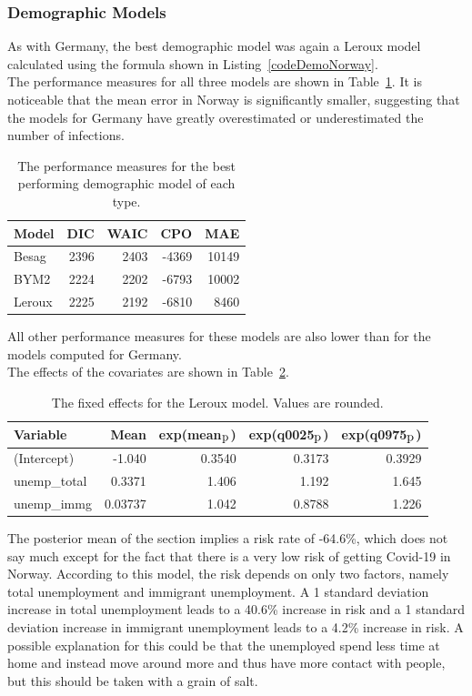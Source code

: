 \subsubsection{Demographic Models}
As with Germany, the best demographic model was again a Leroux model calculated using the formula shown in Listing~\ref{codeDemoNorway}. \\
The performance measures for all three models are shown in Table~\ref{demoNorway}. It is noticeable that the mean error in Norway is significantly smaller, suggesting that the models for Germany have greatly overestimated or underestimated the number of infections.
\begin{table}[H] 
\caption{The performance measures for the best performing demographic model of each type. \label{demoNorway}}
\begin{tabular}{l r r r r}
\toprule
\textbf{Model}	& \textbf{DIC}	& \textbf{WAIC} & \textbf{CPO} & \textbf{MAE}\\
\midrule
Besag  & 2396 & 2403 & -4369 & 10149 \\
BYM2 & 2224 & 2202 & -6793 & 10002\\
Leroux & 2225  & 2192 & -6810 & 8460\\
\bottomrule
\end{tabular}
\end{table}
All other performance measures for these models are also lower than for the models computed for Germany. \\
The effects of the covariates are shown in Table~\ref{fixedDemoNorway}.
\begin{table}[H] 
\caption{The fixed effects for the Leroux model. Values are rounded. \label{fixedDemoNorway}}
\begin{tabular}{l r r r r}
\toprule
\textbf{Variable}	& \textbf{Mean}	& \textbf{exp(mean$_{\hbox{p}}$)} & \textbf{exp(q0025$_{\hbox{p}}$)} & \textbf{exp(q0975$_{\hbox{p}}$)} \\
\midrule
(Intercept) & -1.040 & 0.3540 & 0.3173 & 0.3929 \\
unemp\_total & 0.3371 & 1.406 & 1.192 & 1.645 \\
unemp\_immg & 0.03737 & 1.042 & 0.8788 & 1.226 \\
\bottomrule
\end{tabular}
\end{table}
The posterior mean of the section implies a risk rate of -64.6\%, which does not say much except for the fact that there is a very low risk of getting Covid-19 in Norway. According to this model, the risk depends on only two factors, namely total unemployment and immigrant unemployment. A 1 standard deviation increase in total unemployment leads to a 40.6\% increase in risk and a 1 standard deviation increase in immigrant unemployment leads to a 4.2\% increase in risk. A possible explanation for this could be that the unemployed spend less time at home and instead move around more and thus have more contact with people, but this should be taken with a grain of salt.
